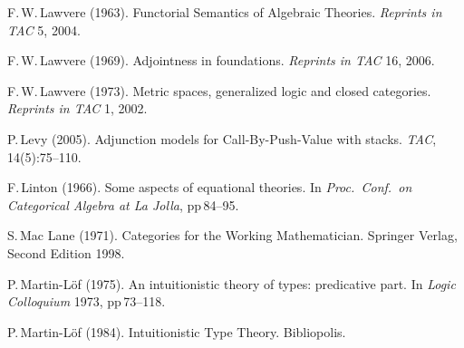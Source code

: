 \documentclass[11pt,twocolumn]{article}
\newcommand{\hide}[1]{}
\begin{document}
{\begin{thebibliography}{000}
F.\,W.\,Lawvere (1963). %
\newblock Functorial Semantics of Algebraic Theories. %
\newblock \emph{Reprints in TAC} 5, 2004.
  
F.\,W.\,Lawvere (1969).
\newblock Adjointness in foundations.
\newblock \emph{Reprints in TAC} 16, 2006.

F.\,W.\,Lawvere (1973).
\newblock Metric spaces, generalized logic and closed categories.
\newblock \emph{Reprints in TAC} 1, 2002.


P.\,Levy (2005).
\newblock Adjunction models for Call-By-Push-Value with stacks.
\newblock \emph{TAC}, 14(5):75--110.

F.\,Linton (1966).
\newblock Some aspects of equational theories.
\newblock In {\em Proc.\ Conf.\ on Categorical Algebra at La Jolla}, pp\,84--95.



S.\,Mac Lane (1971).
\newblock Categories for the Working Mathematician.
\newblock Springer Verlag, Second Edition 1998.


P.\,Martin-L{\"o}f (1975).
\newblock An intuitionistic theory of types: predicative part.
\newblock In \emph{Logic Colloquium} 1973, pp\,73--118.

\hide{
\bibitem{MartinLofCMCP}
P.\,Martin-L{\"o}f (1982).
\newblock Constructive mathematics and computer programming.
\newblock In \emph{Proc.\ Logic, Methodology and Philosophy of Science},
pp\,153--175.
}

P.\,Martin-L{\"o}f (1984).
\newblock Intuitionistic Type Theory.
\newblock Bibliopolis.


\end{thebibliography}}
\end{document}
